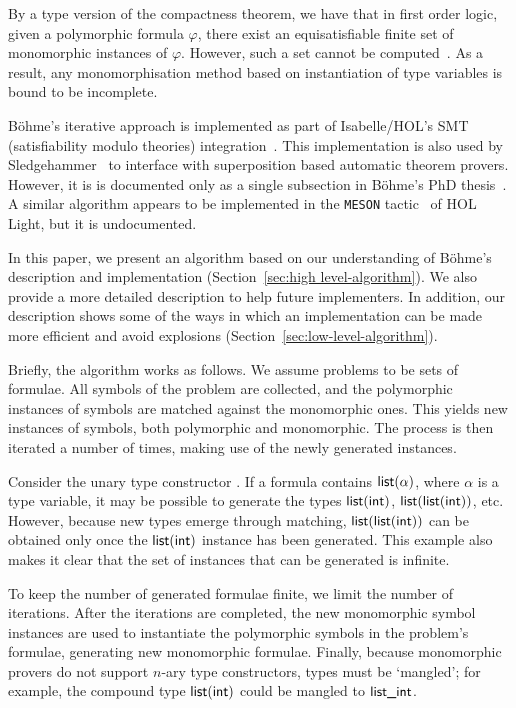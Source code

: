 \documentclass[runningheads]{llncs}
\begin{document}
By a type version of the compactness theorem, we have that in first order logic, given a polymorphic formula \(\varphi\), there exist an equisatisfiable finite set of monomorphic instances of \(\varphi\). However, such a set cannot be computed~\cite[Theorem 1]{expr-poly-types}. As a result, any monomorphisation method based on instantiation of type variables is
bound to be incomplete.

B\"ohme's iterative approach is implemented as part of Isabelle/HOL's SMT (satisfiability modulo theories) integration~\cite[Chapter 2]{sb-phd}. This implementation is also used by Sledgehammer~\cite{judgement,hammer} to interface with superposition based automatic theorem provers. However, it is is documented only as a single subsection in B\"ohme's PhD thesis~\cite[Section 2.2.1]{sb-phd}.
A similar algorithm appears to be implemented in the \texttt{MESON} tactic~\cite{harrison-1996} of HOL Light, but it is undocumented.

In this paper, we present an algorithm based on our understanding of Böhme's description and implementation (Section~\ref{sec:high level-algorithm}). We also provide a more detailed description to help future implementers. In addition, our description shows some of the ways in which an implementation can be made more efficient and avoid explosions (Section~\ref{sec:low-level-algorithm}).

Briefly, the algorithm works as follows. We assume problems to be sets of formulae. All symbols of the problem are collected, and the polymorphic instances of symbols are matched against the monomorphic ones. This yields new instances of symbols, both polymorphic and monomorphic. The process is then iterated
a number of times, making use of the newly generated instances.

Consider the unary type constructor . If a formula contains $\textsf{list}(\alpha)$, where $\alpha$ is a type variable, it may be possible to generate the types $\textsf{list}(\textsf{int})$, $\textsf{list}(\textsf{list}(\textsf{int}))$, etc. However, because new types emerge through matching, $\textsf{list}(\textsf{list}(\textsf{int}))$ can be obtained only once the $\textsf{list}(\textsf{int})$ instance has been generated. This example also makes it clear that the set of instances that can be generated is infinite.

To keep the number of generated formulae finite, we limit the number of iterations. After the iterations are completed, the new monomorphic symbol instances are used to instantiate the polymorphic symbols in the problem's formulae, generating new monomorphic formulae. Finally, because monomorphic provers do not support $n$-ary type constructors, types must be `mangled'; for example, the compound type $\textsf{list}(\textsf{int})$ could be mangled to $\textsf{list\_int}$.
\end{document}
